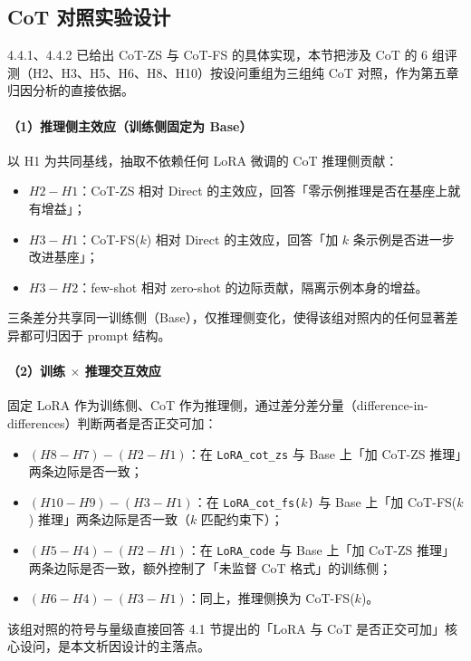 \subsection{CoT 对照实验设计}

4.4.1、4.4.2 已给出 CoT-ZS 与 CoT-FS 的具体实现，本节把涉及 CoT 的 6 组评测（H2、H3、H5、H6、H8、H10）按设问重组为三组纯 CoT 对照，作为第五章归因分析的直接依据。

\paragraph{（1）推理侧主效应（训练侧固定为 Base）}
以 H1 为共同基线，抽取不依赖任何 LoRA 微调的 CoT 推理侧贡献：
\begin{itemize}
    \item \textbf{$H2 - H1$}：CoT-ZS 相对 Direct 的主效应，回答「零示例推理是否在基座上就有增益」；
    \item \textbf{$H3 - H1$}：CoT-FS($k$) 相对 Direct 的主效应，回答「加 $k$ 条示例是否进一步改进基座」；
    \item \textbf{$H3 - H2$}：few-shot 相对 zero-shot 的边际贡献，隔离示例本身的增益。
\end{itemize}
三条差分共享同一训练侧（Base），仅推理侧变化，使得该组对照内的任何显著差异都可归因于 prompt 结构。

\paragraph{（2）训练 $\times$ 推理交互效应}
固定 LoRA 作为训练侧、CoT 作为推理侧，通过差分差分量（difference-in-differences）判断两者是否正交可加：
\begin{itemize}
    \item \textbf{$(H8 - H7) - (H2 - H1)$}：在 \texttt{LoRA\_cot\_zs} 与 Base 上「加 CoT-ZS 推理」两条边际是否一致；
    \item \textbf{$(H10 - H9) - (H3 - H1)$}：在 \texttt{LoRA\_cot\_fs($k$)} 与 Base 上「加 CoT-FS($k$) 推理」两条边际是否一致（$k$ 匹配约束下）；
    \item \textbf{$(H5 - H4) - (H2 - H1)$}：在 \texttt{LoRA\_code} 与 Base 上「加 CoT-ZS 推理」两条边际是否一致，额外控制了「未监督 CoT 格式」的训练侧；
    \item \textbf{$(H6 - H4) - (H3 - H1)$}：同上，推理侧换为 CoT-FS($k$)。
\end{itemize}
该组对照的符号与量级直接回答 4.1 节提出的「LoRA 与 CoT 是否正交可加」核心设问，是本文析因设计的主落点。


